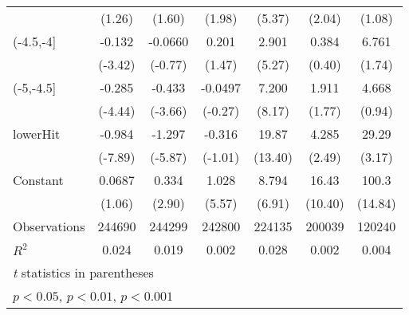 {\begin{tabular}{l*{6}{c}}
                    &      (1.26)         &      (1.60)         &      (1.98)         &      (5.37)         &      (2.04)         &      (1.08)         \\
[1em]
(-4.5,-4]           &      -0.132\sym{***}&     -0.0660         &       0.201         &       2.901\sym{***}&       0.384         &       6.761         \\
                    &     (-3.42)         &     (-0.77)         &      (1.47)         &      (5.27)         &      (0.40)         &      (1.74)         \\
[1em]
(-5,-4.5]           &      -0.285\sym{***}&      -0.433\sym{***}&     -0.0497         &       7.200\sym{***}&       1.911         &       4.668         \\
                    &     (-4.44)         &     (-3.66)         &     (-0.27)         &      (8.17)         &      (1.77)         &      (0.94)         \\
[1em]
lowerHit            &      -0.984\sym{***}&      -1.297\sym{***}&      -0.316         &       19.87\sym{***}&       4.285\sym{*}  &       29.29\sym{**} \\
                    &     (-7.89)         &     (-5.87)         &     (-1.01)         &     (13.40)         &      (2.49)         &      (3.17)         \\
[1em]
Constant            &      0.0687         &       0.334\sym{**} &       1.028\sym{***}&       8.794\sym{***}&       16.43\sym{***}&       100.3\sym{***}\\
                    &      (1.06)         &      (2.90)         &      (5.57)         &      (6.91)         &     (10.40)         &     (14.84)         \\
\hline
Observations        &      244690         &      244299         &      242800         &      224135         &      200039         &      120240         \\
\(R^{2}\)           &       0.024         &       0.019         &       0.002         &       0.028         &       0.002         &       0.004         \\
\hline\hline
\multicolumn{7}{l}{\footnotesize \textit{t} statistics in parentheses}\\
\multicolumn{7}{l}{\footnotesize \sym{*} \(p<0.05\), \sym{**} \(p<0.01\), \sym{***} \(p<0.001\)}\\
\end{tabular}
}
